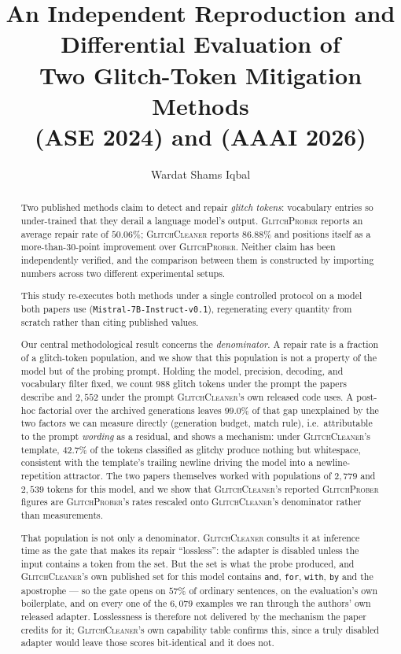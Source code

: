 \documentclass[11pt,a4paper]{article}
\title{\textbf{An Independent Reproduction and Differential Evaluation of\\
Two Glitch-Token Mitigation Methods}\\[0.35em]
\large \gp{} (ASE 2024) and \gc{} (AAAI 2026)}
\author{Wardat Shams Iqbal}
\date{}
\newcommand{\gp}{\textsc{GlitchProber}}
\newcommand{\gc}{\textsc{GlitchCleaner}}
\begin{document}
\maketitle

\begin{abstract}
\noindent
Two published methods claim to detect and repair \emph{glitch tokens}: vocabulary
entries so under-trained that they derail a language model's output. \gp{} reports
an average repair rate of $50.06\%$; \gc{} reports $86.88\%$ and positions itself
as a more-than-30-point improvement over \gp{}. Neither claim has been
independently verified, and the comparison between them is constructed by
importing numbers across two different experimental setups.

This study re-executes both methods under a single controlled protocol on a model
both papers use (\texttt{Mistral-7B-Instruct-v0.1}), regenerating every quantity
from scratch rather than citing published values.

Our central methodological result concerns the \emph{denominator}. A repair rate
is a fraction of a glitch-token population, and we show that this population is
not a property of the model but of the probing prompt. Holding the model,
precision, decoding, and vocabulary filter fixed, we count $988$ glitch tokens
under the prompt the papers describe and $2{,}552$ under the prompt \gc{}'s own
released code uses. A post-hoc factorial over the archived generations leaves
$99.0\%$ of that gap unexplained by the two factors we can measure directly
(generation budget, match rule), i.e.\ attributable to the prompt \emph{wording}
as a residual, and shows a mechanism: under \gc{}'s template, $42.7\%$ of the
tokens classified as glitchy produce nothing but whitespace, consistent with the
template's trailing newline driving the model into a newline-repetition attractor.
The two papers themselves worked with populations of $2{,}779$ and $2{,}539$
tokens for this model, and we show that \gc{}'s reported \gp{} figures are \gp{}'s
rates rescaled onto \gc{}'s denominator rather than measurements.

That population is not only a denominator. \gc{} consults it at inference time as
the gate that makes its repair ``lossless'': the adapter is disabled unless the
input contains a token from the set. But the set is what the probe produced, and
\gc{}'s own published set for this model contains \texttt{and}, \texttt{for},
\texttt{with}, \texttt{by} and the apostrophe --- so the gate opens on $57\%$ of
ordinary sentences, on the evaluation's own boilerplate, and on every one of the
$6{,}079$ examples we ran through the authors' own released adapter. Losslessness
is therefore not delivered by the mechanism the paper credits for it; \gc{}'s own
capability table confirms this, since a truly disabled adapter would leave those
scores bit-identical and it does not.


\end{abstract}
\end{document}
